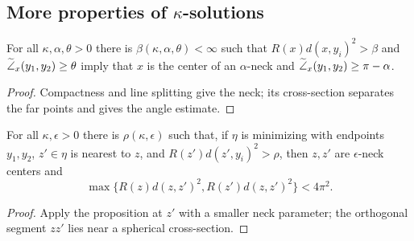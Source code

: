 \subsection{More properties of $\kappa$-solutions}
\begin{proposition}
\label{prop:kl-more-properties-solutions-existence-kappa-solutions}

\label{neckcrit}
For all $\kappa,\alpha,\theta>0$ there is $\beta(\kappa,\alpha,\theta)<\infty$
such that $R(x)d(x,y_i)^2>\beta$ and
$\widetilde{\angle}_x(y_1,y_2)\geq\theta$ imply that $x$ is the center of an
$\alpha$-neck and $\widetilde{\angle}_x(y_1,y_2)\geq\pi-\alpha$.
\end{proposition}
\begin{proof}
\sketch Compactness and line splitting give the neck; its cross-section
separates the far points and gives the angle estimate.
\end{proof}
\begin{corollary}
\label{cor:kl-more-properties-solutions-existence-kappa-solutions}

\label{longsegment}
For all $\kappa,\epsilon>0$ there is $\rho(\kappa,\epsilon)$ such that, if
$\eta$ is minimizing with endpoints $y_1,y_2$, $z'\in\eta$ is nearest to $z$,
and $R(z')d(z',y_i)^2>\rho$, then $z,z'$ are $\epsilon$-neck centers and
\[
\max\{R(z)d(z,z')^2,R(z')d(z,z')^2\}<4\pi^2.
\]
\end{corollary}
\begin{proof}
\sketch Apply the proposition at $z'$ with a smaller neck parameter; the
orthogonal segment $zz'$ lies near a spherical cross-section.
\end{proof}

